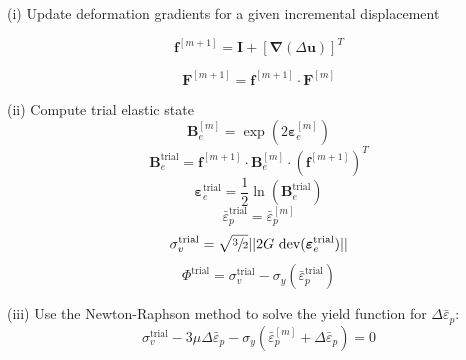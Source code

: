 \documentclass[sn-mathphys,Numbered,draft]{sn-jnl}%
\newcommand{\bb}{\boldsymbol}
\begin{document}
\begin{algorithm}[htb] \label{alg:stressAlg}
\SetAlgoLined
(i) Update deformation gradients for a given incremental displacement

\begin{equation}
  \mathbf{f}^{[m+1]} = \mathbf{I} + \left[ \bb{\nabla}(\Delta\textbf{u}) \right]^T \nonumber
\end{equation}

\begin{equation}
  \mathbf{F}^{[m+1]} = \mathbf{f}^{[m+1]} \cdot \mathbf{F}^{[m]}  \nonumber
\end{equation}

(ii) Compute trial elastic state
\begin{equation}
\mathbf{B}_{e}^{[m]} = \exp\left({2\boldsymbol{\varepsilon}_{e}^{[m]}}\right) \nonumber
\end{equation}
\begin{equation}
\mathbf{B}_{e}^{\text{trial}} = \mathbf{f}^{[m+1]} \cdot \mathbf{B}_{e}^{[m]} \cdot (\mathbf{f}^{[m+1]})^{T}\nonumber
\end{equation}
\begin{equation}
\boldsymbol{\varepsilon}_{e}^{\text{trial}} = \frac{1}{2} \ln(\textbf{B}_{e}^{\text{trial}}) \nonumber
\end{equation}
\begin{equation}
\bar{\varepsilon}^{\text{trial}}_p = \bar{\varepsilon}^{[m]}_p \nonumber
\end{equation}
\begin{equation}
\sigma_{v}^{\text{trial}} = \sqrt{\sfrac{3}{2}} || 2G\ \text{dev}(\boldsymbol{\varepsilon}_{e}^{\text{trial}})|| \nonumber
\end{equation}
\begin{equation}
\Phi^{\text{trial}} =  \sigma_{v}^{\text{trial}} - \sigma_{y}(\bar{\varepsilon}^{\text{trial}}_p) \nonumber 
\end{equation}

(iii) Use the Newton-Raphson method to solve the yield function for $\Delta\bar{\varepsilon}_p$:
\begin{equation}
	\sigma_{v}^{\text{trial}} 
	- 3\mu \Delta\bar{\varepsilon}_p
	-\sigma_{y}(\bar{\varepsilon}^{[m]}_p + \Delta\bar{\varepsilon}_p) = 0 \nonumber
\end{equation}


\end{algorithm}
\end{document}
